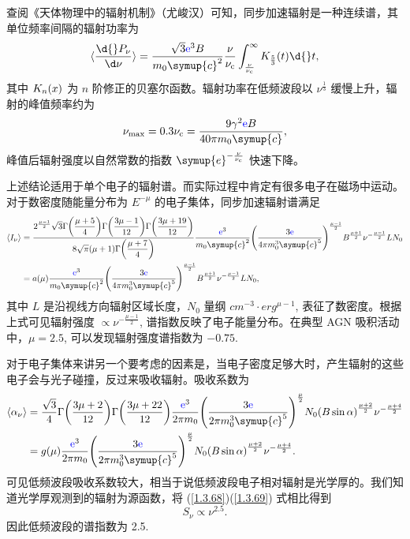 \documentclass[../天体物理基础.tex]{subfiles}
\begin{document}
查阅《天体物理中的辐射机制》（尤峻汉）可知，同步加速辐射是一种连续谱，其单位频率间隔的辐射功率为
\begin{equation}
\langle\frac{\d{}P_{\nu}}{\d\nu}\rangle=\frac{\sqrt3{\color{blue}{\ce{e}}}^{3}B}{m_{0}\symup{c}^{2}}\frac{\nu}{\nu_{\mathrm{c}}}\int_{\frac{\nu}{\nu_{\mathrm{c}}}}^{\infty}K_{\frac{5}{3}}\mleft(t\mright)\d{}t,
\end{equation}
其中 $K_{n}\mleft(x\mright)$ 为 $n$ 阶修正的贝塞尔函数。辐射功率在低频波段以 $\nu^{\frac{1}{3}}$ 缓慢上升，辐射的峰值频率约为
\begin{equation}
\nu_{\max}=0.3\nu_{\mathrm{c}}=\frac{9\gamma^{2}{\color{blue}{\ce{e}}}B}{40\pi m_{0}\symup{c}},
\end{equation}
峰值后辐射强度以自然常数的指数 $\symup{e}^{-\frac{\nu}{\nu_{\mathrm{c}}}}$ 快速下降。

上述结论适用于单个电子的辐射谱。而实际过程中肯定有很多电子在磁场中运动。对于数密度随能量分布为 $E^{-\mu}$ 的电子集体，同步加速辐射谱满足
\begin{align}
\langle I_{\nu}\rangle&=\frac{2^{\frac{\mu-1}{2}}\sqrt3\Gamma\mleft(\dfrac{\mu+5}{4}\mright)\Gamma\mleft(\dfrac{3\mu-1}{12}\mright)\Gamma\mleft(\dfrac{3\mu+19}{12}\mright)}{8\sqrt\pi\mleft(\mu+1\mright)\Gamma\mleft(\dfrac{\mu+7}{4}\mright)}\frac{{\color{blue}{\ce{e}}}^{3}}{m_{0}\symup{c}^{2}}\mleft(\frac{3{\color{blue}{\ce{e}}}}{4\pi m_{0}^{3}\symup{c}^{5}}\mright)^{\frac{\mu-1}2}B^{\frac{\mu+1}{2}}\nu^{-\frac{\mu-1}{2}}LN_{0}\notag\\
&=a\mleft(\mu\mright)\frac{{\color{blue}{\ce{e}}}^{3}}{m_{0}\symup{c}^{2}}\mleft(\frac{3{\color{blue}{\ce{e}}}}{4\pi m_{0}^{3}\symup{c}^{5}}\mright)^{\frac{\mu-1}2}B^{\frac{\mu+1}{2}}\nu^{-\frac{\mu-1}{2}}LN_{0},\label{1.3.68}
\end{align}
其中 $L$ 是沿视线方向辐射区域长度，$N_{0}$ 量纲 $\unit{cm^{-3}\cdot erg^{\mu-1}}$, 表征了数密度。根据上式可见辐射强度 $\propto\nu^{-\frac{\mu-1}{2}}$, 谱指数反映了电子能量分布。在典型 AGN 吸积活动中，$\mu=2.5$, 可以发现辐射强度谱指数为 $-0.75$.

对于电子集体来讲另一个要考虑的因素是，当电子密度足够大时，产生辐射的这些电子会与光子碰撞，反过来吸收辐射。吸收系数为
\begin{align}
\langle\alpha_{\nu}\rangle&=\frac{\sqrt{3}}{4}\Gamma\mleft(\frac{3\mu+2}{12}\mright)\Gamma\mleft(\frac{3\mu+22}{12}\mright)\frac{{\color{blue}{\ce{e}}}^{3}}{2\pi m_{0}}\mleft(\frac{3{\color{blue}{\ce{e}}}}{2\pi m_{0}^{3}\symup{c}^{5}}\mright)^{\frac{\mu}{2}}N_{0}\mleft(B\sin{\alpha}\mright)^{\frac{\mu+2}{2}}\nu^{-\frac{\mu+4}{2}}\notag\\
&=g\mleft(\mu\mright)\frac{{\color{blue}{\ce{e}}}^{3}}{2\pi m_{0}}\mleft(\frac{3{\color{blue}{\ce{e}}}}{2\pi m_{0}^{3}\symup{c}^{5}}\mright)^{\frac{\mu}{2}}N_{0}\mleft(B\sin{\alpha}\mright)^{\frac{\mu+2}{2}}\nu^{-\frac{\mu+4}{2}}.\label{1.3.69}
\end{align}
可见低频波段吸收系数较大，相当于说低频波段电子相对辐射是光学厚的。我们知道光学厚观测到的辐射为源函数，将 (\ref{1.3.68})(\ref{1.3.69}) 式相比得到
\begin{equation}
S_{\nu}\propto\nu^{2.5}.
\end{equation}
因此低频波段的谱指数为 2.5.
\end{document}
